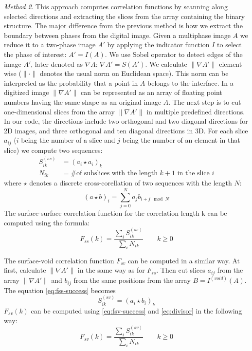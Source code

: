 \documentclass[reprint,amsmath,amssymb,aps,pre]{revtex4-1}
\begin{document}
\textit{Method 2}. This approach computes correlation functions by scanning
along selected directions and extracting the slices from the array containing
the binary structure. The major difference from the previous method is how we
extract the boundary between phases from the digital image. Given a multiphase
image $A$ we reduce it to a two-phase image $A'$ by applying the indicator
function $I$ to select the phase of interest: $A' = I(A)$. We use Sobel operator
to detect edges of the image $A'$, later denoted as $\nabla A$:
$\nabla A' = S(A')$. We calculate $\|\nabla A'\|$ element-wise ($\|\cdot\|$
denotes the usual norm on Euclidean space). This norm can be interpreted as the
probability that a point in $A$ belongs to the interface. In a digitized image
$\|\nabla A'\|$ can be represented as an array of floating point numbers having
the same shape as an original image $A$. The next step is to cut one-dimensional
slices from the array $\|\nabla A' \|$ in multiple predefined directions. In our
code, the directions include two orthogonal and two diagonal directions for 2D
images, and three orthogonal and ten diagonal directions in 3D. For each slice
$a_{ij}$ ($i$ being the number of a slice and $j$ being the number of an element
in that slice) we compute two sequences:
\begin{align}
  S^{(ss)}_{ik} &= (a_i \star a_i)_k \label{eq:fss-success} \\
  N_{ik} &= \text{\# of subslices with the length $k+1$ in the slice $i$} \label{eq:divisor}
\end{align}
where $\star$ denotes a discrete cross-corellation of two sequences with the
length $N$:
\begin{equation*}
  (a\star b)_i = \sum_{j=0}^N a_j b_{i+j \mod N}
\end{equation*}
The surface-surface correlation function for the correlation length k can be
computed using the formula:
\begin{equation*}
  F_{ss}(k) = \frac{\sum_i S^{(ss)}_{ik}}{\sum_i N_{ik}} \qquad k \ge 0
\end{equation*}

The surface-void correlation function $F_{sv}$ can be computed in a similar
way. At first, calculate $\|\nabla A'\|$ in the same way as for $F_{ss}$. Then
cut slices $a_{ij}$ from the array $\|\nabla A'\|$  and $b_{ij}$ from the same
positions from the array $B = I^{(void)}(A)$. The equation \cref{eq:fss-success}
becomes
\begin{equation}
  S^{(sv)}_{ik} = (a_i \star b_i)_k \label{eq:fsv-success}
\end{equation}
$F_{sv}(k)$ can be computed using \cref{eq:fsv-success} and \cref{eq:divisor} in
the following way:
\begin{equation*}
  F_{sv}(k) = \frac{\sum_i S^{(sv)}_{ik}}{\sum_i N_{ik}} \qquad k \ge 0
\end{equation*}
\end{document}
